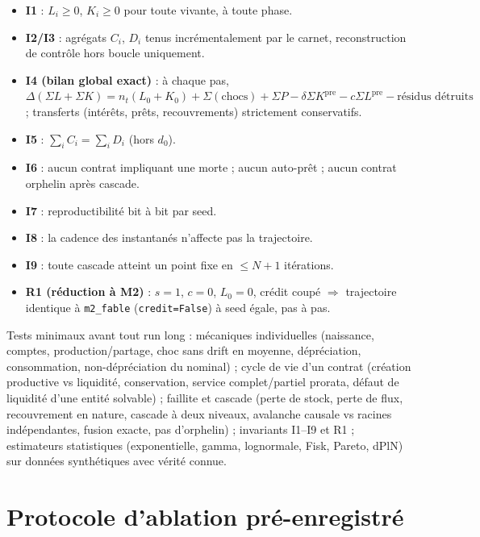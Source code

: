 \documentclass[11pt,a4paper]{article}
\newcommand{\code}[1]{\texttt{#1}}
\begin{document}
\begin{itemize}[leftmargin=1.4em, itemsep=2pt]
\item \textbf{I1} : $L_i \ge 0$, $K_i \ge 0$ pour toute vivante, à toute phase.
\item \textbf{I2/I3} : agrégats $C_i$, $D_i$ tenus incrémentalement par le
  carnet, reconstruction de contrôle hors boucle uniquement.
\item \textbf{I4 (bilan global exact)} : à chaque pas,
  $\Delta(\Sigma L + \Sigma K) = n_t (L_0 + K_0) + \Sigma (\text{chocs})
  + \Sigma P - \delta \Sigma K^{\mathrm{pre}} - c \Sigma L^{\mathrm{pre}}
  - \text{résidus détruits}$ ; transferts (intérêts, prêts, recouvrements)
  strictement conservatifs.
\item \textbf{I5} : $\sum_i C_i = \sum_i D_i$ (hors $d_0$).
\item \textbf{I6} : aucun contrat impliquant une morte ; aucun auto-prêt ;
  aucun contrat orphelin après cascade.
\item \textbf{I7} : reproductibilité bit à bit par seed.
\item \textbf{I8} : la cadence des instantanés n'affecte pas la trajectoire.
\item \textbf{I9} : toute cascade atteint un point fixe en $\le N + 1$
  itérations.
\item \textbf{R1 (réduction à M2)} : $s = 1$, $c = 0$, $L_0 = 0$, crédit coupé
  $\Rightarrow$ trajectoire identique à \code{m2\_fable} (\code{credit=False})
  à seed égale, pas à pas.
\end{itemize}
Tests minimaux avant tout run long : mécaniques individuelles (naissance,
comptes, production/partage, choc sans drift en moyenne, dépréciation,
consommation, non-dépréciation du nominal) ; cycle de vie d'un contrat
(création productive vs liquidité, conservation, service complet/partiel
prorata, défaut de liquidité d'une entité solvable) ; faillite et cascade
(perte de stock, perte de flux, recouvrement en nature, cascade à deux
niveaux, avalanche causale vs racines indépendantes, fusion exacte, pas
d'orphelin) ; invariants I1--I9 et R1 ; estimateurs statistiques
(exponentielle, gamma, lognormale, Fisk, Pareto, dPlN) sur données
synthétiques avec vérité connue.

\section{Protocole d'ablation pré-enregistré}
\end{document}
